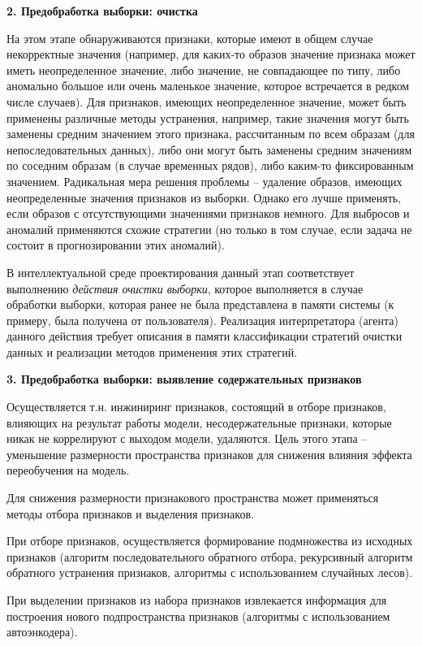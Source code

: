 \textbf{2. Предобработка выборки: очистка}

На этом этапе обнаруживаются признаки, которые имеют в общем случае некорректные значения (например, для каких-то образов значение признака может иметь неопределенное значение, либо значение, не совпадающее по типу, либо аномально большое или очень маленькое значение, которое встречается в редком числе случаев).  Для признаков, имеющих неопределенное значение, может быть применены различные методы устранения, например, такие значения могут быть заменены средним значением этого признака, рассчитанным по всем образам (для непоследовательных данных), либо они могут быть заменены средним значениям по соседним образам (в случае временных рядов), либо каким-то фиксированным значением. Радикальная мера решения проблемы -- удаление образов, имеющих неопределенные значения признаков из выборки. Однако его лучше применять, если образов с отсутствующими значениями признаков немного. Для выбросов и аномалий применяются схожие стратегии (но только в том случае, если задача не состоит в прогнозировании этих аномалий).

В интеллектуальной среде проектирования данный этап соответствует выполнению \textit{действия очистки выборки}, которое выполняется в случае обработки выборки, которая ранее не была представлена в памяти системы (к примеру, была получена от пользователя). 
Реализация интерпретатора (агента) данного действия требует описания в памяти классификации стратегий очистки данных и реализации методов применения этих стратегий. 

\textbf{3. Предобработка выборки: выявление содержательных признаков}

Осуществляется т.н. инжиниринг признаков, состоящий в отборе признаков, влияющих на результат работы модели, несодержательные признаки, которые никак не коррелируют с выходом модели, удаляются. Цель этого этапа -- уменьшение размерности пространства признаков для снижения влияния эффекта переобучения на модель.

Для снижения размерности признакового пространства может применяться методы отбора признаков и выделения признаков.

При отборе признаков, осуществляется формирование подмножества из исходных признаков (алгоритм последовательного обратного отбора, рекурсивный алгоритм обратного устранения признаков,  алгоритмы с использованием случайных лесов). 

При выделении признаков из набора признаков извлекается информация для построения нового подпространства признаков (алгоритмы с использованием автоэнкодера).

